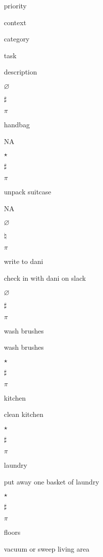 \documentclass[]{book}
\newenvironment{Shaded}{\begin{snugshade}}{\end{snugshade}}
\newcommand{\KeywordTok}[1]{\textcolor[rgb]{0.13,0.29,0.53}{\textbf{#1}}}
\newcommand{\NormalTok}[1]{#1}
\newcommand{\OperatorTok}[1]{\textcolor[rgb]{0.81,0.36,0.00}{\textbf{#1}}}
\newcommand{\StringTok}[1]{\textcolor[rgb]{0.31,0.60,0.02}{#1}}
\begin{document}
\begin{Shaded}
\end{Shaded}

priority

context

category

task

description

\(\varnothing\)

\(\sharp\)

\(\pi\)

handbag

NA

\(\star\)

\(\sharp\)

\(\pi\)

unpack suitcase

NA

\(\varnothing\)

\(\natural\)

\(\pi\)

write to dani

check in with dani on slack

\(\varnothing\)

\(\sharp\)

\(\pi\)

wash brushes

wash brushes

\(\star\)

\(\sharp\)

\(\pi\)

kitchen

clean kitchen

\(\star\)

\(\sharp\)

\(\pi\)

laundry

put away one basket of laundry

\(\star\)

\(\sharp\)

\(\pi\)

floors

vacuum or sweep living area
\end{document}
